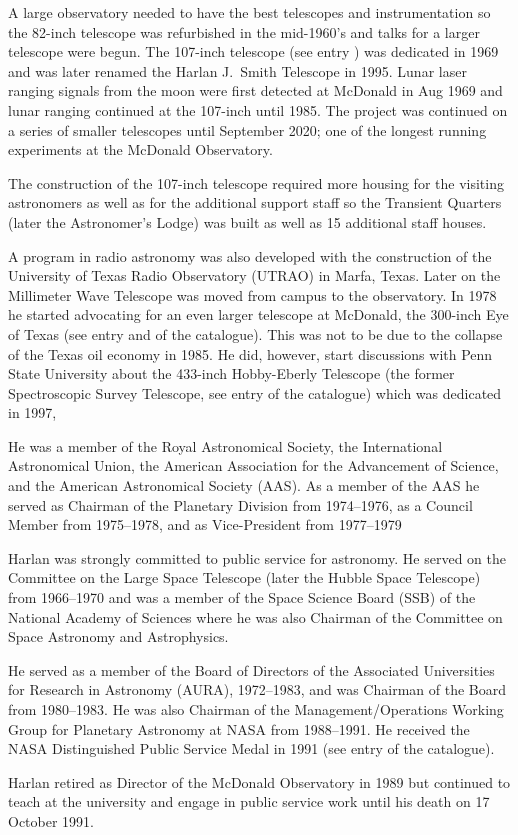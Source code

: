 A large observatory needed to have the best telescopes and
instrumentation so the 82-inch telescope was refurbished in the
mid-1960's and talks for a larger telescope were begun.  The 107-inch
telescope (see entry ) was dedicated in 1969 and was later
renamed the Harlan J.~Smith Telescope in 1995. Lunar laser ranging
signals from the moon were first detected at McDonald in Aug 1969 and
lunar ranging continued at the 107-inch until 1985. The project was
continued on a series of smaller telescopes until September 2020; one
of the longest running experiments at the McDonald Observatory.

The construction of the 107-inch telescope required more housing for the
visiting astronomers as well as for the additional support staff
so the Transient Quarters (later the Astronomer's Lodge) was
built as well as 15 additional staff houses.

A program in radio astronomy was also developed with the construction
of the University of Texas Radio Observatory (UTRAO) in Marfa,
Texas. Later on the Millimeter Wave Telescope was moved from campus to
the observatory. In 1978 he started advocating for an even larger
telescope at McDonald, the 300-inch Eye of Texas (see
entry  and  of the catalogue). This was not to
be due to the collapse of the Texas oil economy in 1985. He did,
however, start discussions with Penn State University about the
433-inch Hobby-Eberly Telescope (the former Spectroscopic Survey
Telescope, see entry  of the catalogue) which was dedicated
in 1997,

He was a member of the Royal Astronomical Society, the International
Astronomical Union, the American Association for the Advancement of
Science, and the American Astronomical Society (AAS). As a member of
the AAS he served as Chairman of the Planetary Division from
1974--1976, as a Council Member from 1975--1978, and as Vice-President
from 1977--1979

Harlan was strongly committed to public service for astronomy. He
served on the Committee on the Large Space Telescope
(later the Hubble Space Telescope) from 1966--1970 and was a member of the
Space Science Board (SSB) of the National Academy of Sciences where he
was also Chairman of the Committee on Space Astronomy and
Astrophysics.

He served as a member of the Board of Directors of the Associated
Universities for Research in Astronomy (AURA), 1972--1983, and was
Chairman of the Board from 1980--1983. He was also Chairman of the
Management/Operations Working Group for Planetary Astronomy at NASA
from 1988--1991.  He received the NASA Distinguished Public Service
Medal in 1991 (see entry  of the catalogue).

Harlan retired as Director of the McDonald Observatory in 1989  but
continued to teach at the university and engage in public service work
until his death on 17 October 1991.


